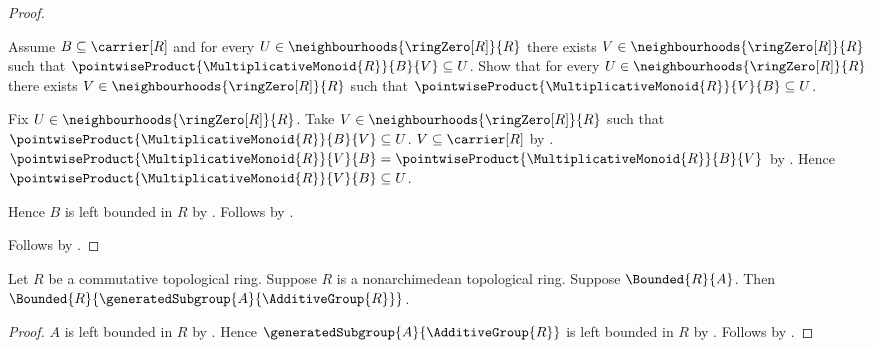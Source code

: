 \begin{proof}
    \begin{subproof}
        Assume $B\subseteq\carrier[R]$ and
            for every $U\in\neighbourhoods{\ringZero[R]}{R}$ there exists
                $V\in\neighbourhoods{\ringZero[R]}{R}$ such that
                $\pointwiseProduct{\MultiplicativeMonoid{R}}{B}{V}
                    \subseteq U$.
        Show that for every $U\in\neighbourhoods{\ringZero[R]}{R}$ there
            exists $V\in\neighbourhoods{\ringZero[R]}{R}$ such that
            $\pointwiseProduct{\MultiplicativeMonoid{R}}{V}{B}\subseteq U$.
        \begin{subproof}
            Fix $U\in\neighbourhoods{\ringZero[R]}{R}$.
            Take $V\in\neighbourhoods{\ringZero[R]}{R}$ such that
                $\pointwiseProduct{\MultiplicativeMonoid{R}}{B}{V}
                    \subseteq U$.
            $V\subseteq\carrier[R]$ by
                .
            $\pointwiseProduct{\MultiplicativeMonoid{R}}{V}{B}
                =\pointwiseProduct{\MultiplicativeMonoid{R}}{B}{V}$ by
                .
            Hence $\pointwiseProduct{\MultiplicativeMonoid{R}}{V}{B}
                \subseteq U$.
        \end{subproof}
        Hence $B$ is left bounded in $R$ by .
        Follows by .
    \end{subproof}
    Follows by \auto.
\end{proof}

\begin{corollary}\label{nonarchimedean_generated_subgroup_bounded}
    Let $R$ be a commutative topological ring.
    Suppose $R$ is a nonarchimedean topological ring.
    Suppose $\Bounded{R}{A}$.
    Then $\Bounded{R}{\generatedSubgroup{A}{\AdditiveGroup{R}}}$.
\end{corollary}
\begin{proof}
    $A$ is left bounded in $R$ by .
    Hence $\generatedSubgroup{A}{\AdditiveGroup{R}}$ is left bounded in $R$
        by .
    Follows by .
\end{proof}
